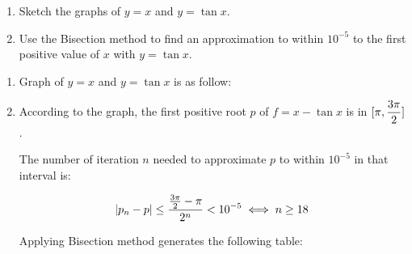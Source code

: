 \documentclass[../../Assignments.tex]{subfiles}
\begin{document}
\begin{exercise}
    \begin{enumerate}[label = (\alph*)]
        \item Sketch the graphs of \(y = x\) and \(y = \tan{x}\).
        \item Use the Bisection method to find an approximation to within
            \(10^{-5}\) to the first positive value of \(x\) with \(y =
            \tan{x}\).
    \end{enumerate}
\end{exercise}

\begin{solution}
    \begin{enumerate}[label = (\alph*)]
        \item Graph of \(y = x\) and \(y = \tan{x}\) is as follow:

            \begin{center}
                
            \end{center}

        \item According to the graph, the first positive root \(p\) of \(f = x -
            \tan{x}\) is in \(\interval{\pi}{\dfrac{3 \pi}{2}}\).

            The number of iteration \(n\) needed to approximate \(p\) to within
            \(10^{-5}\) in that interval is:

            \[\abs{p_n - p} \leq \frac{\frac{3 \pi}{2} - \pi}{2^n} < 10^{-5} \iff n \geq 18\]

            Applying Bisection method generates the following table:


\end{enumerate}
\end{solution}
\end{document}
